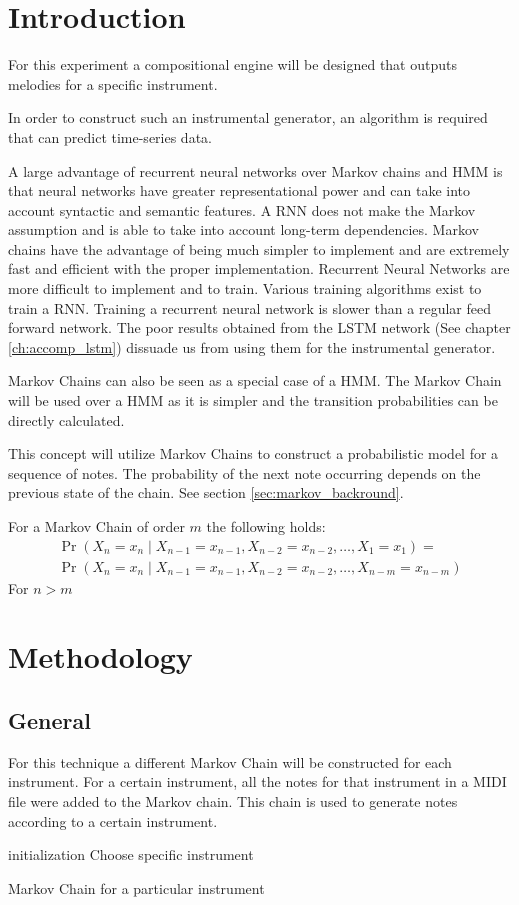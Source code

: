 \section{Introduction}
For this experiment a compositional engine will be designed that outputs melodies for a specific instrument. 

In order to construct such an instrumental generator, an algorithm is required that can predict time-series data.

A large advantage of recurrent neural networks over Markov chains and \acs{HMM} is that neural networks have greater representational power and can take into account syntactic and semantic features. A \ac{RNN} does not make the Markov assumption and is able to take into account long-term dependencies.
Markov chains have the advantage of being much simpler to implement and are extremely fast and efficient with the proper implementation. 
Recurrent Neural Networks are more difficult to implement and to train. Various training algorithms exist to train a \ac{RNN}. Training a recurrent neural network is slower than a regular feed forward network. The poor results obtained from the \ac{LSTM} network (See chapter \ref{ch:accomp_lstm}) dissuade us from using them for the instrumental generator.

Markov Chains can also be seen as a special case of a \ac{HMM}. The Markov Chain will be used over a \ac{HMM} as it is simpler and the transition probabilities can be directly calculated.

This concept will utilize Markov Chains to construct a probabilistic model for a sequence of notes. The probability of the next note occurring depends on the previous state of the chain. See section \ref{sec:markov_backround}.

For a Markov Chain of order $m$ the following holds:
\begin{align}
\Pr(X_n=x_n\mid X_{n-1}=x_{n-1}, X_{n-2}=x_{n-2}, \dots , X_1=x_1) =
\\  \Pr(X_n=x_n\mid X_{n-1}=x_{n-1}, X_{n-2}=x_{n-2}, \dots, X_{n-m}=x_{n-m})
\end{align}
For $n > m$

\section{Methodology}
\subsection{General}
For this technique a different Markov Chain will be constructed for each instrument. 
For a certain instrument, all the notes for that instrument in a MIDI file were added to the Markov chain. This chain is used to generate notes according to a certain instrument.
\begin{algorithm}
 initialization\;
 Choose specific instrument\;
 \caption{Markov Chain for a particular instrument}
 \label{algo:instrumm}
\end{algorithm}


